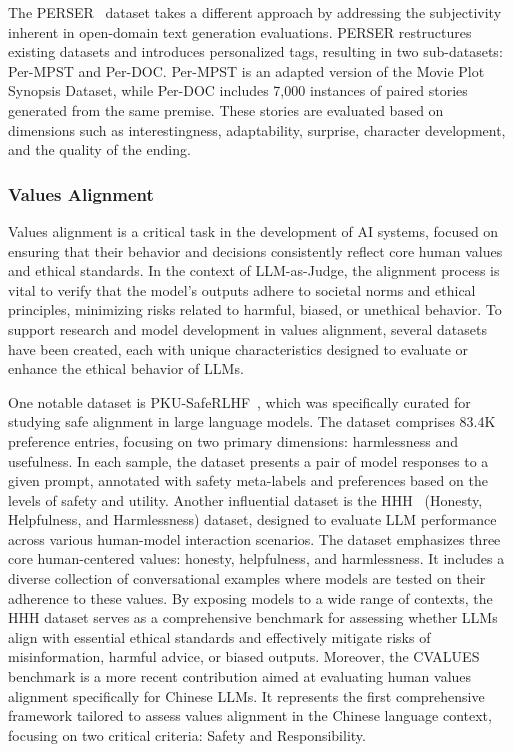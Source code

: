 The PERSER~\cite{wang2023learning} dataset takes a different approach by addressing the subjectivity inherent in open-domain text generation evaluations. PERSER restructures existing datasets and introduces personalized tags, resulting in two sub-datasets: Per-MPST and Per-DOC. Per-MPST is an adapted version of the Movie Plot Synopsis Dataset, while Per-DOC includes 7,000 instances of paired stories generated from the same premise. These stories are evaluated based on dimensions such as interestingness, adaptability, surprise, character development, and the quality of the ending. 


\subsubsection{Values Alignment}
\label{sec:Values Alignment}
Values alignment is a critical task in the development of AI systems, focused on ensuring that their behavior and decisions consistently reflect core human values and ethical standards. In the context of LLM-as-Judge, the alignment process is vital to verify that the model's outputs adhere to societal norms and ethical principles, minimizing risks related to harmful, biased, or unethical behavior. To support research and model development in values alignment, several datasets have been created, each with unique characteristics designed to evaluate or enhance the ethical behavior of LLMs.

One notable dataset is PKU-SafeRLHF~\cite{ji2024pku}, which was specifically curated for studying safe alignment in large language models. The dataset comprises 83.4K preference entries, focusing on two primary dimensions: harmlessness and usefulness. In each sample, the dataset presents a pair of model responses to a given prompt, annotated with safety meta-labels and preferences based on the levels of safety and utility. 
Another influential dataset is the HHH~\cite{askell2021general} (Honesty, Helpfulness, and Harmlessness) dataset, designed to evaluate LLM performance across various human-model interaction scenarios. The dataset emphasizes three core human-centered values: honesty, helpfulness, and harmlessness. It includes a diverse collection of conversational examples where models are tested on their adherence to these values. By exposing models to a wide range of contexts, the HHH dataset serves as a comprehensive benchmark for assessing whether LLMs align with essential ethical standards and effectively mitigate risks of misinformation, harmful advice, or biased outputs.
Moreover, the CVALUES~\cite{xu2023cvalues} benchmark is a more recent contribution aimed at evaluating human values alignment specifically for Chinese LLMs. It represents the first comprehensive framework tailored to assess values alignment in the Chinese language context, focusing on two critical criteria: Safety and Responsibility.


